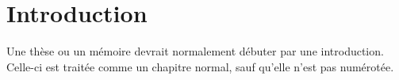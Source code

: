 \chapter*{Introduction}         %

Une thèse ou un mémoire devrait normalement débuter par une
introduction. Celle-ci est traitée comme un chapitre normal, sauf
qu'elle n'est pas numérotée.
